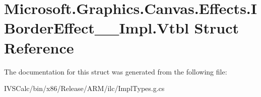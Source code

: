 \hypertarget{struct_microsoft_1_1_graphics_1_1_canvas_1_1_effects_1_1_i_border_effect_____impl_1_1_vtbl}{}\section{Microsoft.\+Graphics.\+Canvas.\+Effects.\+I\+Border\+Effect\+\_\+\+\_\+\+Impl.\+Vtbl Struct Reference}
\label{struct_microsoft_1_1_graphics_1_1_canvas_1_1_effects_1_1_i_border_effect_____impl_1_1_vtbl}


The documentation for this struct was generated from the following file\+:\begin{DoxyCompactItemize}
\item 
I\+V\+S\+Calc/bin/x86/\+Release/\+A\+R\+M/ilc/Impl\+Types.\+g.\+cs\end{DoxyCompactItemize}
